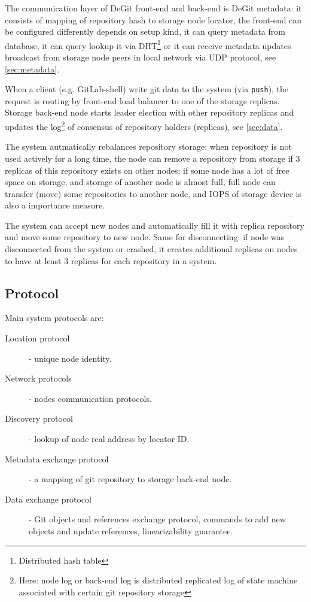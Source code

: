 \documentclass[nonacm=true]{acmart}
\newcommand{\code}[1]{\texttt{#1}}
\begin{document}
The communication layer of DeGit front-end and back-end is DeGit metadata: it consists of mapping
of repository hash to storage node locator, the front-end can be configured differently depends on
setup kind, it can query metadata from database, it can query lookup it via DHT\footnote{Distributed hash table}
or it can receive metadata updates broadcast from storage node peers in local network via UDP protocol,
see \ref{sec:metadata}.

When a client (e.g. GitLab-shell) write git data to the system (via \code{push}), the request is routing
by front-end load balancer to one of the storage replicas.
Storage back-end node starts leader election with other repository replicas and updates the log\footnote{Here: node log
or back-end log is distributed replicated log of state machine associated with certain git repository storage}
of consensus of repository holders (replicas), see \ref{sec:data}.

The system autmatically rebalances repository storage: when repository is not used actively for a
long time, the node can remove a repository from storage if 3 replicas of this repository exists on other nodes;
if some node has a lot of free space on storage, and storage of another node is almost full,
full node can transfer (move) some repositories to another node, and IOPS of storage device is also
a importance measure.

The system can accept new nodes and automatically fill it with replica repository and
move some repository to new node. Same for disconnecting: if node was disconnected from the system or crashed,
it creates additional replicas on nodes to have at least 3 replicas for each repository in a system.

\subsection{Protocol}
Main system protocols are:
\begin{description}
  \item[Location protocol] - unique node identity.
  \item[Network protocols] - nodes communication protocols.
  \item[Discovery protocol] - lookup of node real address by locator ID.
  \item[Metadata exchange protocol] - a mapping of git repository to storage back-end node.
  \item[Data exchange protocol] - Git objects and references exchange protocol,
    commands to add new objects and update references, linearizability guarantee.
\end{description}
\end{document}
